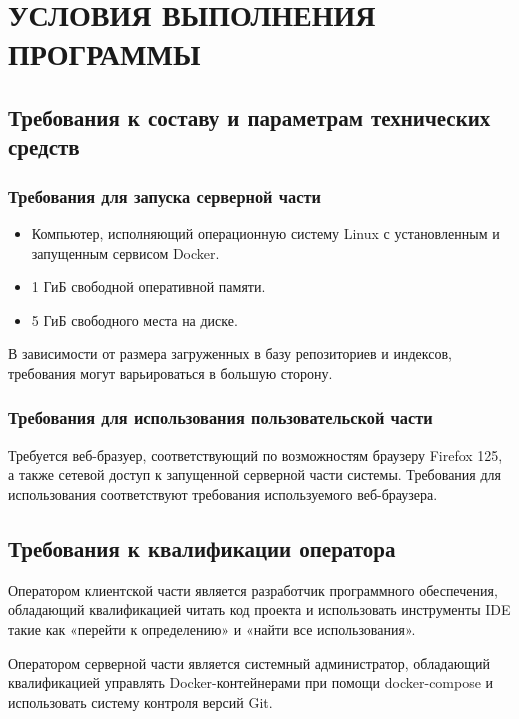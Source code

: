 \section{\uppercase{Условия выполнения программы}}

\subsection{Требования к составу и параметрам технических средств}
    \subsubsection{Требования для запуска серверной части}
        \begin{itemize}
            \item Компьютер, исполняющий операционную систему Linux с установленным и запущенным сервисом Docker.
            \item 1 ГиБ свободной оперативной памяти.
            \item 5 ГиБ свободного места на диске.
        \end{itemize}
        
        В зависимости от размера загруженных в базу репозиториев и индексов, требования могут варьироваться в большую сторону.
    
   \subsubsection{Требования для использования пользовательской части}
        Требуется веб-бразуер, соответствующий по возможностям браузеру Firefox 125, а также сетевой доступ к запущенной серверной части системы. Требования для использования соответствуют требования используемого веб-браузера.
    
\subsection{Требования к квалификации оператора}
    Оператором клиентской части является разработчик программного обеспечения, обладающий квалификацией читать код проекта и использовать инструменты IDE такие как «перейти к определению» и «найти все использования».
    
    Оператором серверной части является системный администратор, обладающий квалификацией управлять Docker-контейнерами при помощи docker-compose и использовать систему контроля версий Git.

\clearpage